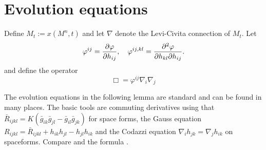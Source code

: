 \documentclass{amsart}
\theoremstyle{definition}
\theoremstyle{remark}
\numberwithin{equation}{section}
\begin{document}
\section{Evolution equations}
Define \(M_t := x(M^n,t)\) and let $\nabla$ denote the Levi-Civita connection of $M_t$. Let 
\[
\varphi^{ij} = \frac{\partial\varphi}{\partial h_{ij}}, \quad \varphi^{ij,kl} = \frac{\partial^2\varphi}{\partial h_{kl} \partial h_{ij}}.
\]
and define the operator
\[
\Box = \varphi^{ij} \nabla_i \nabla_j
\]

The evolution equations in the following lemma are standard and can be found in many places. The basic tools are commuting derivatives using that \(\bar{R}_{ijkl} = K(\bar{g}_{ik}\bar{g}_{jl} - \bar{g}_{il}\bar{g}_{jk})\) for space forms, the Gauss equation \(R_{ijkl} = \bar{R}_{ijkl} + h_{ik}h_{jl} - h_{jl}h_{ik}\) and the Codazzi equation \(\nabla_i h_{jk} = \nabla_j h_{ik}\) on spaceforms. Compare \cite[p.~94-95]{Gerhardt:/2006} and the formula \cite[eq.~(6.17)]{Gerhardt:01/1996}.
\end{document}
